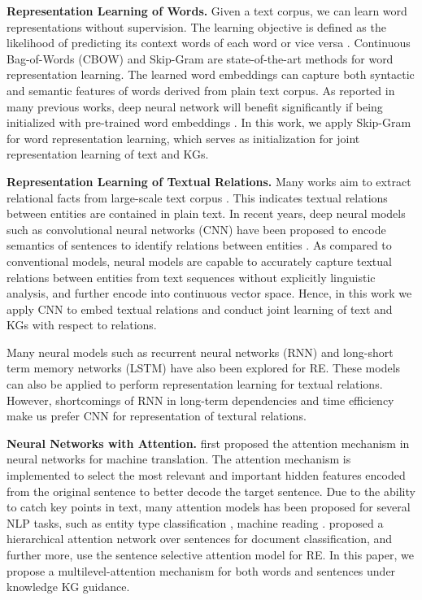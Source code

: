\documentclass[11pt,a4paper]{article}
\begin{document}
\textbf{Representation Learning of Words.} Given a text corpus, we can learn word representations without supervision. The learning objective is defined as the likelihood of predicting its context words of each word or vice versa \cite{mikolov2013distributed}. Continuous Bag-of-Words (CBOW) \cite{mikolov2013efficient} and Skip-Gram \cite{mikolov2013linguistic} are state-of-the-art methods for word representation learning. The learned word embeddings can capture both syntactic and semantic features of words derived from plain text corpus. As reported in many previous works, deep neural network will benefit significantly if being initialized with pre-trained word embeddings \cite{erhan2010does}. In this work, we apply Skip-Gram for word representation learning, which serves as initialization for joint representation learning of text and KGs.

\textbf{Representation Learning of Textual Relations.} Many works aim to extract relational facts from large-scale text corpus \cite{mintz2009distant,riedel2010modeling}. This indicates textual relations between entities are contained in plain text. In recent years, deep neural models such as convolutional neural networks (CNN) have been proposed to encode semantics of sentences to identify relations between entities \cite{zeng2014relation,dos2015classifying,zeng2015distant,lin2016neural}. As compared to conventional models, neural models are capable to accurately capture textual relations between entities from text sequences without explicitly linguistic analysis, and further encode into continuous vector space. Hence, in this work we apply CNN to embed textual relations and conduct joint learning of text and KGs with respect to relations.

Many neural models such as recurrent neural networks (RNN) \cite{zhang2015relation} and long-short term memory networks (LSTM) \cite{xu2015classifying,miwa2016end} have also been explored for RE. These models can also be applied to perform representation learning for textual relations. However, shortcomings of RNN in long-term dependencies and time efficiency make us prefer CNN for representation of textural relations.

\textbf{Neural Networks with Attention.} \cite{bahdanau2014neural} first proposed the attention mechanism in neural networks for machine translation. The attention mechanism is implemented to select the most relevant and important hidden features encoded from the original sentence to better decode the target sentence. Due to the ability to catch key points in text, many attention models has been proposed for several NLP tasks, such as entity type classification \cite{shimaoka2016attentive}, machine reading \cite{hermann2015teaching,dhingra2016gated,sordoni2016iterative}. \cite{yang2016hierarchical} proposed a hierarchical attention network over sentences for document classification, and further more, \cite{lin2016neural} use the sentence selective attention model for RE. In this paper, we propose a multilevel-attention mechanism for both words and sentences under knowledge KG guidance.
\end{document}
